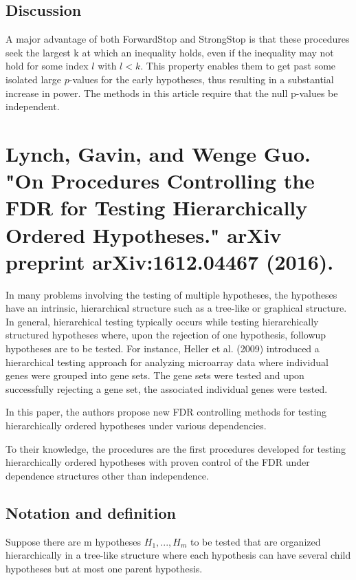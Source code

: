 \documentclass{article}
\begin{document}
\subsection{Discussion}
A major advantage of both ForwardStop and StrongStop is that these procedures seek the largest k at which an inequality holds, even if the inequality may not hold for some index $l$ with $l < k$. This property enables them to get past some isolated large $p$-values for the early hypotheses, thus resulting in a substantial increase in power. The methods in this article require that the null p-values be independent.


\cleardoublepage

\section{Lynch, Gavin, and Wenge Guo. "On Procedures Controlling the FDR for Testing Hierarchically Ordered Hypotheses." arXiv preprint arXiv:1612.04467 (2016).}
In many problems involving the testing of multiple hypotheses, the hypotheses have an intrinsic, hierarchical structure such as a tree-like or graphical structure. In general, hierarchical testing typically occurs while testing hierarchically structured hypotheses where, upon the rejection of one hypothesis, followup
hypotheses are to be tested. For instance, Heller et al. (2009) introduced a hierarchical testing approach for analyzing microarray data where individual genes were grouped into gene sets. The gene sets were tested and upon successfully rejecting a gene set, the associated individual genes were tested. 


In this paper, the authors propose new FDR controlling methods for testing hierarchically ordered hypotheses under various dependencies.

To their knowledge, the procedures are the first procedures developed for testing hierarchically ordered hypotheses with proven control of the FDR under dependence structures other than independence.

\subsection{Notation and definition}
Suppose there are m hypotheses $H_1,...,H_m$ to be tested that are organized hierarchically in a tree-like structure where each hypothesis can have several child hypotheses but at most
one parent hypothesis.
\end{document}
